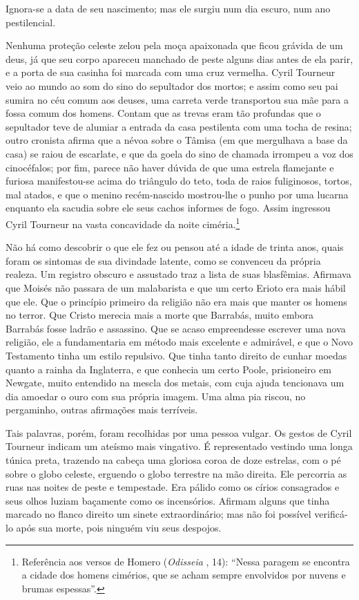 Ignora-se a data de seu nascimento; mas ele surgiu num dia escuro, num ano
pestilencial.

Nenhuma proteção celeste zelou pela moça apaixonada que ficou grávida de um
deus, já que seu corpo apareceu manchado de peste alguns dias antes de ela
parir, e a porta de sua casinha foi marcada com uma cruz vermelha. Cyril
Tourneur veio ao mundo ao som do sino do sepultador dos mortos; e assim
como seu pai sumira no céu comum aos deuses, uma carreta verde transportou
sua mãe para a fossa comum dos homens. Contam que as trevas eram tão
profundas que o sepultador teve de alumiar a entrada da casa pestilenta
com uma tocha de resina; outro cronista afirma que a névoa sobre o Tâmisa
(em que mergulhava a base da casa) se raiou de escarlate, e que da goela
do sino de chamada irrompeu a voz dos cinocéfalos; por fim, parece não
haver dúvida de que uma estrela flamejante e furiosa manifestou-se acima
do triângulo do teto, toda de raios fuliginosos, tortos, mal atados, e que
o menino recém-nascido mostrou-lhe o punho por uma lucarna enquanto ela
sacudia sobre ele seus cachos informes de fogo. Assim ingressou Cyril
Tourneur na vasta concavidade da noite ciméria.\footnote{ Referência aos
versos de Homero (\textit{Odisseia} , 14): ``Nessa paragem
se encontra a cidade dos homens cimérios, que se acham sempre envolvidos
por nuvens e brumas espessas''.}

Não há como descobrir o que ele fez ou pensou até a idade de trinta anos,
quais foram os sintomas de sua divindade latente, como se convenceu da
própria realeza. Um registro obscuro e assustado traz a lista de suas
blasfêmias. Afirmava que Moisés não passara de um malabarista e que um
certo Erioto era mais hábil que ele. Que o princípio primeiro da religião
não era mais que manter os homens no terror. Que Cristo merecia mais a
morte que Barrabás, muito embora Barrabás fosse ladrão e assassino. Que se
acaso empreendesse escrever uma nova religião, ele a fundamentaria em
método mais excelente e admirável, e que o Novo Testamento tinha um estilo
repulsivo. Que tinha tanto direito de cunhar moedas quanto a rainha da
Inglaterra, e que conhecia um certo Poole, prisioneiro em Newgate, muito
entendido na mescla dos metais, com cuja ajuda tencionava um dia amoedar o
ouro com sua própria imagem. Uma alma pia riscou, no pergaminho, outras
afirmações mais terríveis.

Tais palavras, porém, foram recolhidas por uma pessoa vulgar. Os gestos de
Cyril Tourneur indicam um ateísmo mais vingativo. É representado vestindo
uma longa túnica preta, trazendo na cabeça uma gloriosa coroa de doze
estrelas, com o pé sobre o globo celeste, erguendo o globo terrestre na
mão direita. Ele percorria as ruas nas noites de peste e tempestade. Era
pálido como os círios consagrados e seus olhos luziam baçamente como os
incensórios. Afirmam alguns que tinha marcado no flanco direito um sinete
extraordinário; mas não foi possível verificá-lo após sua morte, pois
ninguém viu seus despojos.

